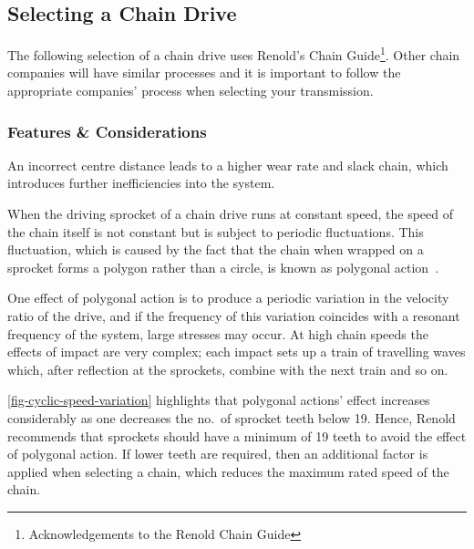 

\subsection{Selecting a Chain Drive}

The following selection of a chain drive uses Renold's Chain Guide\footnote{Acknowledgements to the Renold Chain Guide}. Other chain companies will have similar processes and it is important to follow the appropriate companies' process when selecting your transmission.

\subsubsection{Features \& Considerations}

An  incorrect centre distance leads to a higher wear rate and slack chain, which introduces further inefficiencies into the system. %

When the driving sprocket of a chain drive runs at constant speed, the speed of the chain itself is not constant but is subject to periodic fluctuations. This fluctuation, which is caused by the fact that the chain when wrapped on a sprocket forms a polygon rather than a circle, is known as polygonal action~\cite{mahalingam1958}.

One effect of polygonal action is to produce a periodic variation in the velocity ratio of the drive, and if the frequency of this variation coincides with a resonant frequency of the system, large stresses may occur. At high chain speeds the effects of impact are very complex; each impact sets up a train of travelling waves which, after reflection at the sprockets, combine with the next train and so on.

\cref{fig-cyclic-speed-variation} highlights that polygonal actions' effect increases considerably as one decreases the no.\ of sprocket teeth below 19. Hence, Renold recommends that sprockets should have a minimum of 19 teeth to avoid the effect of polygonal action. If lower teeth are required, then an additional factor is applied when selecting a chain, which reduces the maximum rated speed of the chain.

